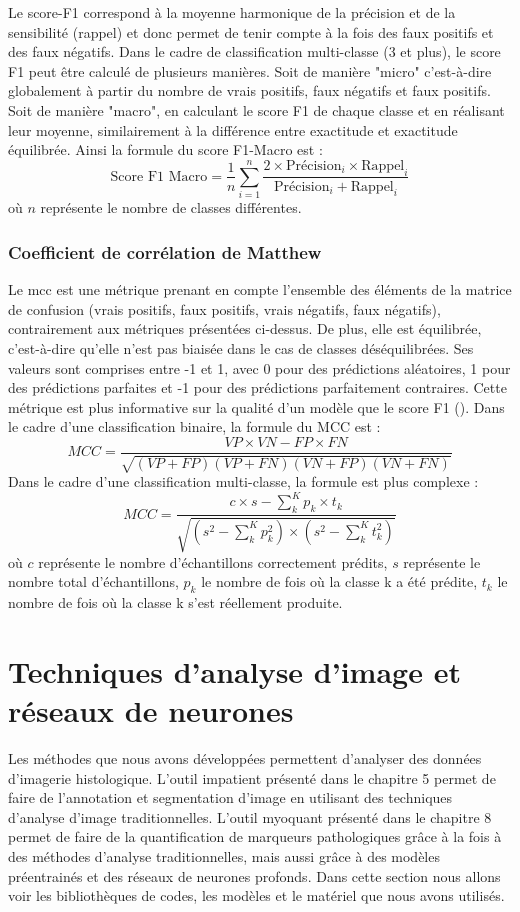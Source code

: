 Le score-F1 correspond à la moyenne harmonique de la précision et de la sensibilité (rappel) et donc permet de tenir compte à la fois des faux positifs et des faux négatifs. Dans le cadre de classification multi-classe (3 et plus), le score F1 peut être calculé de plusieurs manières. Soit de manière "micro" c'est-à-dire globalement à partir du nombre de vrais positifs, faux négatifs et faux positifs. Soit de manière "macro", en calculant le score F1 de chaque classe et en réalisant leur moyenne, similairement à la différence entre exactitude et exactitude équilibrée. Ainsi la formule du score F1-Macro est :
\[ \text{Score F1 Macro} = \frac{1}{n} \sum_{i=1}^{n} \frac{2 \times \text{Précision}_i \times \text{Rappel}_i}{\text{Précision}_i + \text{Rappel}_i} \] où \(n\) représente le nombre de classes différentes.

\subsubsection{Coefficient de corrélation de Matthew}
Le \gls{mcc} est une métrique prenant en compte l'ensemble des éléments de la matrice de confusion (vrais positifs, faux positifs, vrais négatifs, faux négatifs), contrairement aux métriques présentées ci-dessus. De plus, elle est équilibrée, c'est-à-dire qu'elle n'est pas biaisée dans le cas de classes déséquilibrées. Ses valeurs sont comprises entre -1 et 1, avec 0 pour des prédictions aléatoires, 1 pour des prédictions parfaites et -1 pour des prédictions parfaitement contraires. Cette métrique est plus informative sur la qualité d'un modèle que le score F1 (\cite{chicco_advantages_2020}). Dans le cadre d'une classification binaire, la formule du MCC est :
\[ MCC = \frac{VP \times VN - FP \times FN}{\sqrt{(VP + FP)(VP + FN)(VN + FP)(VN + FN)}} \]
Dans le cadre d'une classification multi-classe, la formule est plus complexe :
\[ MCC = \frac{
    c \times s - \sum_{k}^{K} p_k \times t_k
}{\sqrt{
    (s^2 - \sum_{k}^{K} p_k^2) \times
    (s^2 - \sum_{k}^{K} t_k^2)
}} \]
où \(c\) représente le nombre d'échantillons correctement prédits, \(s\) représente le nombre total d'échantillons, \(p_k\) le nombre de fois où la classe k a été prédite, \(t_k\) le nombre de fois où la classe k s'est réellement produite.

\section{Techniques d'analyse d'image et réseaux de neurones}
Les méthodes que nous avons développées permettent d'analyser des données d'imagerie histologique. L'outil \gls{impatient} présenté dans le chapitre 5 permet de faire de l'annotation et segmentation d'image en utilisant des techniques d'analyse d'image traditionnelles. L'outil \gls{myoquant} présenté dans le chapitre 8 permet de faire de la quantification de marqueurs pathologiques grâce à la fois à des méthodes d'analyse traditionnelles, mais aussi grâce à des modèles préentrainés et des réseaux de neurones profonds.  Dans cette section nous allons voir les bibliothèques de codes, les modèles et le matériel que nous avons utilisés. 

